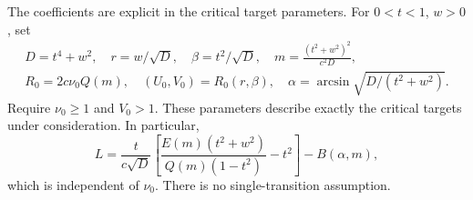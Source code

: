 \documentclass[11pt,a4paper]{article}
\theoremstyle{remark}\newtheorem{remark}[theorem]{Remark}
\begin{document}
The coefficients are explicit in the critical target parameters.
For $0<t<1$, $w>0$, set
\begin{equation}\label{eq:dilation-critical-target}
 \begin{gathered}
 D=t^4+w^2,\quad r=w/\sqrt D,\quad \beta=t^2/\sqrt D,
 \quad m=\frac{(t^2+w^2)^2}{c^2D},\\
 R_0=2c\nu_0Q(m),\quad (U_0,V_0)=R_0(r,\beta),
 \quad \alpha=\arcsin\sqrt{D/(t^2+w^2)}.
 \end{gathered}
\end{equation}
Require $\nu_0\ge1$ and $V_0>1$. These parameters describe exactly the
critical targets under consideration. In particular,
\begin{equation}\label{eq:dilation-explicit-L}
 L=\frac{t}{c\sqrt D}
   \left[\frac{E(m)(t^2+w^2)}{Q(m)(1-t^2)}-t^2\right]
   -B(\alpha,m),
\end{equation}
which is independent of $\nu_0$. There is no single-transition assumption.
\end{document}
